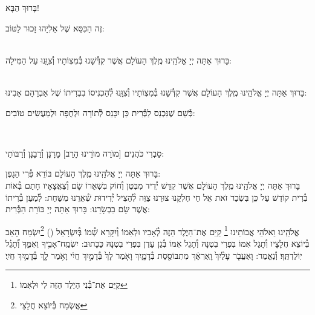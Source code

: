 \documentclass[twoside, openany, parskip=half, 11pt]{book}
\begin{document}
\begin{Large}
בָּרוּךְ הַבָּא!

\end{Large}

זֶה הַכִּסֵּא שֶׁל אֵלִיָּהוּ זָכוּר לַטּוֹב:


\\
בָּרוּךְ אַתָּה יְיָ אֱלֹהֵֽינוּ מֶֽלֶךְ הָעוֹלָם אֲשֶׁר קִדְּ֯שָׁנוּ בְּ֯מִצְוֹתָיו וְ֯צִוָּֽנוּ עַל הַמִּילָה:

\\
בָּרוּךְ אַתָּה יְיָ אֱלֹהֵֽינוּ מֶֽלֶךְ הָעוֹלָם אֲשֶׁר קִדְּ֯שָׁנוּ בְּ֯מִצְוֹתָיו וְ֯צִוָּֽנוּ לְ֯הַכְנִיסוֹ בִבְרִיתוֹ שֶׁל אַבְרָהָם אָבִינוּ:

\kahal
כְּ֯שֵׁם שֶׁנִּכְנַס לַבְּ֯רִית כֵּן יִכָּנֵס לְ֯תוֹרָה וּלְחֻפָּה וּלְמַעֲשִׂים טוֹבִים:

\\
\begin{footnotesize}
סַבְרִי כֹּהֲנִים [מוׂרֵה מוׂרֵינוּ הָרַב] מָרָנָן וְ֯רַבָנָן וְ֯רַבּוׂתַי:\\
\end{footnotesize}
בָּרוּךְ אַתָּה יְיָ אֱלֹהֵֽינוּ מֶֽלֶךְ הָעוֹלָם בּוֹרֵא פְּ֯רִי הַגָפֶן:\\
בָּרוּךְ אַתָּה יְיָ אֱלֹהֵֽינוּ מֶֽלֶךְ הָעוֹלָם אֲשֶׁר קִדַּשׁ יְ֯דִיד מִבֶּטֶן וְ֯חוֹק בִּשְׁאֵרוֹ שָׂם וְ֯צֶאֱצָאָיו חָתַם בְּ֯אוֹת בְּ֯רִית קוֹדֶשׁ עַל כֵּן בִּשְׂכַר זֹאת אֵל חַי חֶלְקֵנוּ צוּרֵנוּ צַוֵּה לְ֯הַצִיל יְ֯דִידוּת שְׁ֯אֵרֵנוּ מִשַּׁחַת: לְ֯מַעַן בְּ֯רִיתוֹ אֲשֶׁר שָׂם בִבְשָׂרֵנוּ: בָּרוּךְ אַתָּה יְיָ כּוֹרֵת הַבְּ֯רִית:

אֱלֹהֵֽינוּ וֵאלֹהֵי אֲבוֹתֵינוּ \footnote{
קַיֵּם אֶת־בְּ֯נִי הַיֶלֶד הַזֶּה לִי וּלְאִמוֹ} קַיֵּם אֶת־הַיֶּלֶד הַזֶּה לְ֯אָבִיו וּלְאִמוֹ וְ֯יִקָּרֵא שְׁ֯מוֹ בְּ֯יִשְׂרָאֵל () \footnote{
אֱשְׂמַח בְּ֯יוֹצֵא חֲלָצַי}יִשְׂמַח הָאַב בְּ֯יוֹצֵא חֲלָצָיו וְ֯תָגֵל אִמּוֹ בִּפְרִי בִטְנָהּ וְ֯תָגֵל אִמּוֹ בְּ֯גַן עֵדֶן בִּפְרִי בִטְנָהּ
כַּכָּתוּב: יִשְׂמַֽח־אָבִ֥יךָ וְאִמֶּ֑ךָ וְ֝֯תָגֵ֗ל יֽוֹלַדְתֶּֽךָ׃
וְ֯נֶאֱמַר: וָאֶעֱבֹ֤ר עָלַ֨יִךְ֙ וָֽאֶרְאֵ֔ךְ מִתְבּוֹסֶ֖סֶת בְּ֯דָמָ֑יִךְ
וָאֹ֤מַר לָךְ֙ בְּ֯דָמַ֣יִךְ חֲיִ֔י וָאֹ֥מַר לָ֖ךְ בְּ֯דָמַ֥יִךְ חֲיִֽי׃
\end{document}
